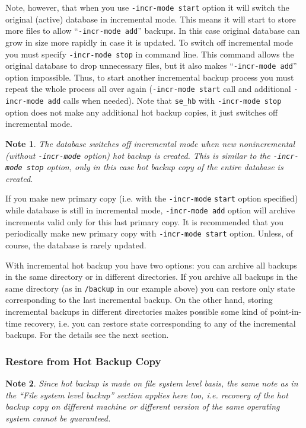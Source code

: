 \documentclass[a4paper,12pt]{article}
\newtheorem{note}{Note}    %
\begin{document}
Note, however, that when you use \verb!-incr-mode start! option it will switch
the original (active) database in incremental mode. This means it will start to
store more files to allow ``\verb!-incr-mode add!'' backups. In this case
original database can grow in size more rapidly in case it is updated. To switch
off incremental mode you must specify \verb!-incr-mode stop! in command line.
This command allows the original database to drop unnecessary files, but it also
makes ``\verb!-incr-mode add!'' option impossible. Thus, to start another
incremental backup process you must repeat the whole process all over again
(\verb!-incr-mode start! call and additional \verb!-incr-mode add! calls when
needed). Note that \verb!se_hb! with \verb!-incr-mode stop! option does not make
any additional hot backup copies, it just switches off incremental mode.

\begin{note}
The database switches off incremental mode when new nonincremental (without
\verb!-incr-mode! option) hot backup is created. This is similar to the
\verb!-incr-mode stop! option, only in this case hot backup copy of the entire
database is created.
\end{note}

If you make new primary copy (i.e. with the \verb!-incr-mode! \verb!start!
option specified) while database is still in incremental mode,
\verb!-incr-mode add! option will archive increments valid only for this last
primary copy. It is recommended that you periodically make new primary copy with
\verb!-incr-mode start! option. Unless, of course, the database is rarely
updated.

With incremental hot backup you have two options: you can archive all backups in
the same directory or in different directories. If you archive all backups in
the same directory (as in \verb!/backup! in our example above) you can restore
only state corresponding to the last incremental backup. On the other hand,
storing incremental backups in different directories makes possible some kind of
point-in-time recovery, i.e. you can restore state corresponding to any of the
incremental backups. For the details see the next section.

\subsubsection*{Restore from Hot Backup Copy}

\begin{note}
Since hot backup is made on file system level basis, the same note as in the
``File system level backup'' section applies here too, i.e. recovery of the hot
backup copy on different machine or different version of the same operating
system cannot be guaranteed.
\end{note}
\end{document}
